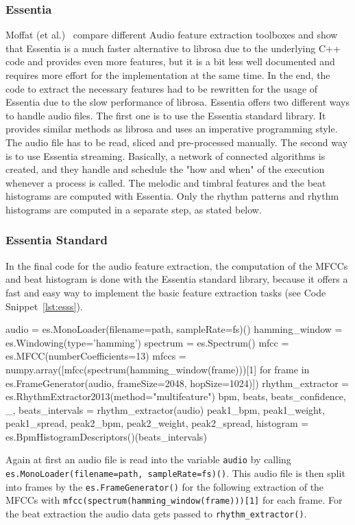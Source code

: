 \subsubsection{Essentia}

Moffat (et al.)~\cite{audiofeattoolb} compare different Audio feature extraction toolboxes and show that Essentia is a much faster alternative to librosa due to the underlying C++ code and provides even more features, but it is a bit less well documented and requires more effort for the implementation at the same time. In the end, the code to extract the necessary features had to be rewritten for the usage of Essentia due to the slow performance of librosa. Essentia offers two different ways to handle audio files. The first one is to use the Essentia standard library. It provides similar methods as librosa and uses an imperative programming style. The audio file has to be read, sliced and pre-processed manually. The second way is to use Essentia streaming. Basically, a network of connected algorithms is created, and they handle and schedule the "how and when" of the execution whenever a process is called. The melodic and timbral features and the beat histograms are computed with Essentia. Only the rhythm patterns and rhythm histograms are computed in a separate step, as stated below. 

\subsubsection{Essentia Standard}

In the final code for the audio feature extraction, the computation of the MFCCs and beat histogram is done with the Essentia standard library, because it offers a fast and easy way to implement the basic feature extraction tasks (see Code Snippet~\ref{lst:esss}). 
\begin{pythonCode}[frame=single,label={lst:esss},caption={Essentia standard},captionpos=b]
audio = es.MonoLoader(filename=path, sampleRate=fs)()
hamming_window = es.Windowing(type='hamming')
spectrum = es.Spectrum()
mfcc = es.MFCC(numberCoefficients=13)
mfccs = numpy.array([mfcc(spectrum(hamming_window(frame)))[1] for frame in es.FrameGenerator(audio, frameSize=2048, hopSize=1024)])
rhythm_extractor = es.RhythmExtractor2013(method="multifeature")
bpm, beats, beats_confidence, _, beats_intervals = rhythm_extractor(audio)
peak1_bpm, peak1_weight, peak1_spread, peak2_bpm, peak2_weight, peak2_spread, histogram = es.BpmHistogramDescriptors()(beats_intervals)
\end{pythonCode}
Again at first an audio file is read into the variable \lstinline{audio} by calling \lstinline{es.MonoLoader(filename=path, sampleRate=fs)()}. This audio file is then split into frames by the \lstinline{es.FrameGenerator()} for the following extraction of the MFCCs with \lstinline{mfcc(spectrum(hamming_window(frame)))[1]} for each frame. For the beat extraction the audio data gets passed to \lstinline{rhythm_extractor()}.\\

